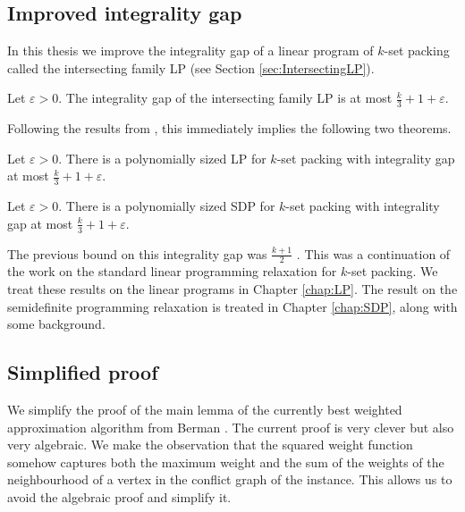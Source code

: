 





\subsection{Improved integrality gap}\label{subsec:IntroGap}

In this thesis we improve the integrality gap of a linear program of $k$-set packing called the intersecting family LP (see Section \ref{sec:IntersectingLP}).
%
\begin{theorem}\label{thm:IntegralityGap1}
Let $\varepsilon > 0$. The integrality gap of the intersecting family LP is at most $\frac{k}{3} + 1 + \varepsilon$.
\end{theorem}
%
Following the results from \cite{LapChiLau}, this immediately implies the following two theorems.
%
\begin{theorem}\label{thm:LP1}
Let $\varepsilon > 0$. There is a polynomially sized LP for $k$-set packing with integrality gap at most $\frac{k}{3} + 1 + \varepsilon$.
\end{theorem}
%
\begin{theorem}\label{thm:SDP1}
Let $\varepsilon > 0$. There is a polynomially sized SDP for $k$-set packing with integrality gap at most $\frac{k}{3} + 1 + \varepsilon$.
\end{theorem}
%
The previous bound on this integrality gap was $\frac{k+1}{2}$ \cite{LapChiLau}. This was a continuation of the work on the standard linear programming relaxation for $k$-set packing. We treat these results on the linear programs in Chapter \ref{chap:LP}. The result on the semidefinite programming relaxation is treated in Chapter \ref{chap:SDP}, along with some background.

\subsection{Simplified proof}\label{subsec:IntroBerman}

We simplify the proof of the main lemma of the currently best weighted approximation algorithm from Berman \cite[Lemma 2]{Berman}. The current proof is very clever but also very algebraic. We make the observation that the squared weight function somehow captures both the maximum weight and the sum of the weights of the neighbourhood of a vertex in the conflict graph of the instance. This allows us to avoid the algebraic proof and simplify it.

